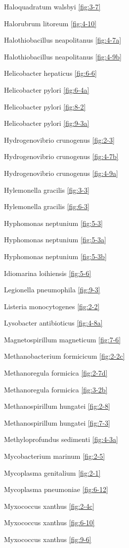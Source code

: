 \documentclass[]{tufte-book}
\begin{document}
Haloquadratum walsbyi \ref{fig:3-7}

Halorubrum litoreum \ref{fig:4-10}

Halothiobacillus neapolitanus \ref{fig:4-7a}

Halothiobacillus neapolitanus \ref{fig:4-9b}

Helicobacter hepaticus \ref{fig:6-6}

Helicobacter pylori \ref{fig:6-4a}

Helicobacter pylori \ref{fig:8-2}

Helicobacter pylori \ref{fig:9-3a}

Hydrogenovibrio crunogenus \ref{fig:2-3}

Hydrogenovibrio crunogenus \ref{fig:4-7b}

Hydrogenovibrio crunogenus \ref{fig:4-9a}

Hylemonella gracilis \ref{fig:3-3}

Hylemonella gracilis \ref{fig:6-3}

Hyphomonas neptunium \ref{fig:5-3}

Hyphomonas neptunium \ref{fig:5-3a}

Hyphomonas neptunium \ref{fig:5-3b}

Idiomarina loihiensis \ref{fig:5-6}

Legionella pneumophila \ref{fig:9-3}

Listeria monocytogenes \ref{fig:2-2}

Lysobacter antibioticus \ref{fig:4-8a}

Magnetospirillum magneticum \ref{fig:7-6}

Methanobacterium formicicum \ref{fig:2-2c}

Methanoregula formicica \ref{fig:2-7d}

Methanoregula formicica \ref{fig:3-2b}

Methanospirillum hungatei \ref{fig:2-8}

Methanospirillum hungatei \ref{fig:7-3}

Methyloprofundus sedimenti \ref{fig:4-3a}

Mycobacterium marinum \ref{fig:2-5}

Mycoplasma genitalium \ref{fig:2-1}

Mycoplasma pneumoniae \ref{fig:6-12}

Myxococcus xanthus \ref{fig:2-4c}

Myxococcus xanthus \ref{fig:6-10}

Myxococcus xanthus \ref{fig:9-6}
\end{document}

